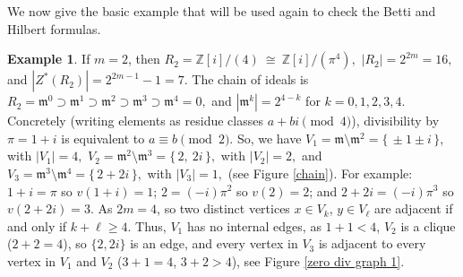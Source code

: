 \documentclass[12pt]{article}
\theoremstyle{definition}
\newtheorem{example}[theorem]{Example}
\begin{document}
\medskip

We now give the basic example that will be used again to check the Betti and Hilbert formulas.

\medskip

\begin{example}\label{ex:gaussian-m2-layers}
	 If $m=2$, then	$R_2=\mathbb Z[i]/(4)\ \cong\ \mathbb Z[i]/(\pi^4),$ $|R_2|=2^{2m}=16,$ and $|Z^*(R_2)|=2^{2m-1}-1=7.$	The chain of ideals is $R_2=\mathfrak m^0 \supset \mathfrak m^1 \supset \mathfrak m^2 \supset \mathfrak m^3 \supset \mathfrak m^4=0,$ and	$|\mathfrak m^k|=2^{4-k}$ for $k=0,1,2,3,4$. Concretely (writing elements as residue classes $a+bi\pmod 4$), divisibility by $\pi=1+i$ is equivalent to
	$a\equiv b\pmod 2$. So, we have $V_1=\mathfrak m\setminus \mathfrak m^2=\{\,\pm 1\pm i\,\},$ with $ |V_1|=4,$
	$V_2=\mathfrak m^2\setminus \mathfrak m^3=\{\,2,\ 2i\,\},$ with $|V_2|=2,$ and $V_3=\mathfrak m^3\setminus \mathfrak m^4=\{\,2+2i\,\},$ with $|V_3|=1,$ (see Figure \ref{chain}). For example: $1+i=\pi$ so $v(1+i)=1$; $2=(-i)\pi^2$ so $v(2)=2$; and $2+2i=(-i)\pi^3$ so $v(2+2i)=3$.  As $2m=4$, so two distinct vertices $x\in V_k$, $y\in V_\ell$ are adjacent if and only if $k+\ell\ge 4$. Thus, $V_1$ has no internal edges, as $1+1<4$, $V_2$ is a clique ($2+2=4$), so $\{2,2i\}$ is an edge, and every vertex in $V_3$ is adjacent to every vertex in $V_1$ and $V_2$ ($3+1=4$, $3+2>4$), see Figure \ref{zero div graph 1}. 
\end{example}

\medskip
\end{document}
